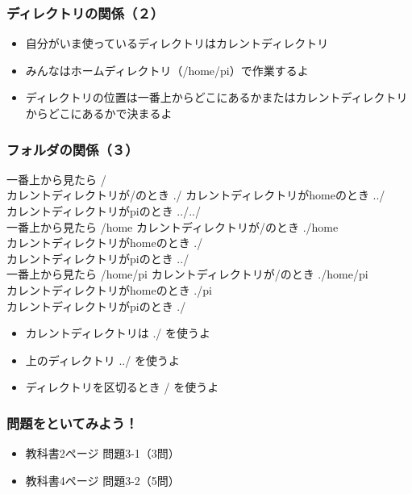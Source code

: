\begin{frame}
    \frametitle{ディレクトリの関係（２）}
    \begin{itemize}
        \item 自分がいま使っているディレクトリはカレントディレクトリ
        \item みんなはホームディレクトリ（/home/pi）で作業するよ
        \item ディレクトリの位置は一番上からどこにあるかまたはカレントディレクトリからどこにあるかで決まるよ
    \end{itemize}
\end{frame}

\begin{frame}
    \frametitle{フォルダの関係（３）}
    一番上から見たら /\\
    カレントディレクトリが/のとき ./ カレントディレクトリがhomeのとき ../\\
    カレントディレクトリがpiのとき ../../\\

    一番上から見たら /home カレントディレクトリが/のとき ./home\\
    カレントディレクトリがhomeのとき ./\\
    カレントディレクトリがpiのとき ../\\

    一番上から見たら /home/pi カレントディレクトリが/のとき ./home/pi\\
    カレントディレクトリがhomeのとき ./pi\\
    カレントディレクトリがpiのとき ./\\

    \begin{itemize}
        \item カレントディレクトリは ./ を使うよ
        \item 上のディレクトリ ../ を使うよ
        \item ディレクトリを区切るとき / を使うよ
    \end{itemize}
\end{frame}

\begin{frame}
    \frametitle{問題をといてみよう！}
    \begin{itemize}
        \item 教科書2ページ 問題3-1（3問）
        \item 教科書4ページ 問題3-2（5問）
    \end{itemize}
\end{frame}

